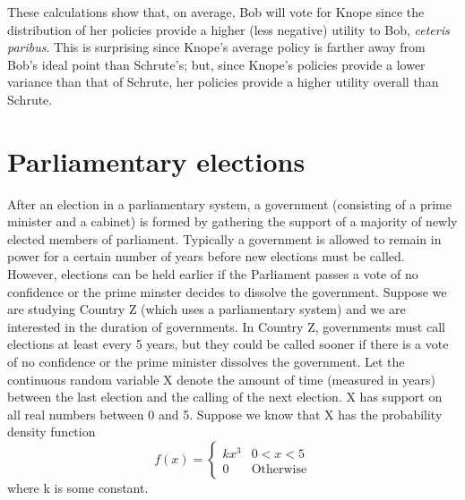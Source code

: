 \documentclass[12pt]{article}
\begin{document}
\begin{enumerate}
These calculations show that, on average, Bob will vote for Knope since the distribution of her policies provide a higher (less negative) utility to Bob, \emph{ceteris paribus}. This is surprising since Knope's average policy is farther away from Bob's ideal point than Schrute's; but, since Knope's policies provide a lower variance than that of Schrute, her policies provide a higher utility overall than Schrute.

\end{enumerate}


\section{Parliamentary elections}
After an election in a parliamentary system, a government (consisting of a prime minister and a cabinet) is formed by gathering the support of a majority of newly elected members of parliament. Typically a government is allowed to remain in power for a certain number of years before new elections must be called. However, elections can be held earlier if the Parliament passes a vote of no confidence or the prime minster decides to dissolve the government. Suppose we are studying Country Z (which uses a parliamentary system) and we are interested in the duration of governments. In Country Z, governments must call elections at least every 5 years, but they could be called sooner if there is a vote of no confidence or the prime minister dissolves the government. Let the continuous random variable X denote the amount of time (measured in years) between the last election and the calling of the next election. X has support on all real numbers between 0 and 5. Suppose we know that X has the probability density function
\[f(x) = \begin{cases}
    kx^3 & 0<x<5 
    \\ 0 & \text{Otherwise}
\end{cases}\]
where k is some constant.
\end{document}
